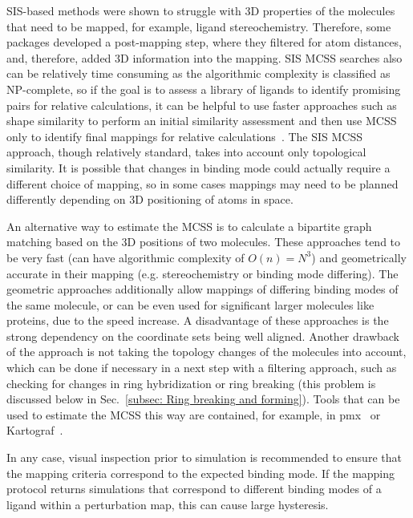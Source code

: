 \documentclass[9pt,bestpractices]{livecoms}
\begin{document}
SIS-based methods were shown to struggle with 3D properties of the molecules that need to be mapped, for example, ligand stereochemistry. Therefore, some packages developed a post-mapping step, where they filtered for atom distances, and, therefore, added 3D information into the mapping.
SIS MCSS searches also can be relatively time consuming as the algorithmic complexity is classified as NP-complete, so if the goal is to assess a library of ligands to identify promising pairs for relative calculations, it can be helpful to use faster approaches such as shape similarity to perform an initial similarity assessment and then use MCSS only to identify final mappings for relative calculations~\cite{raymond2002maximum,klabunde2012mars,jones2009elucidating, Duesbury2018Comparison}. The SIS MCSS approach, though relatively standard, takes into account only topological similarity. It is possible that changes in binding mode could actually require a different choice of mapping, so in some cases mappings may need to be planned differently depending on 3D positioning of atoms in space. 

An alternative way to estimate the MCSS is to calculate a bipartite graph matching based on the 3D positions of two molecules. These approaches tend to be very fast (can have algorithmic complexity of $O(n)=N^3$) and geometrically accurate in their mapping (e.g. stereochemistry or binding mode differing).
The geometric approaches additionally allow mappings of differing binding modes of the same molecule, or can be even used for significant larger molecules like proteins, due to the speed increase.
A disadvantage of these approaches is the strong dependency on the coordinate sets being well aligned. Another drawback of the approach is not taking the topology changes of the molecules into account, which can be done if necessary in a next step with a filtering approach, such as checking for changes in ring hybridization or ring breaking (this problem is discussed below in Sec.~\ref{subsec: Ring breaking and forming}).
Tools that can be used to estimate the MCSS this way are contained, for example, in pmx~\cite{gapsys2015pmx} or Kartograf~\cite{ries2024kartograf}.

In any case, visual inspection prior to simulation is recommended to ensure that the mapping criteria correspond to the expected binding mode. If the mapping protocol returns simulations that correspond to different binding modes of a ligand within a perturbation map, this can cause large hysteresis.
\end{document}
